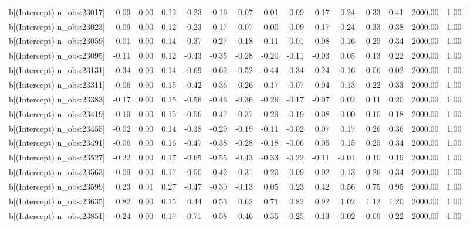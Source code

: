 \begin{table}[ht]
\begin{tabular}{rrrrrrrrrrrrrrr}
  b[(Intercept) n\_obs:23017] & 0.09 & 0.00 & 0.12 & -0.23 & -0.16 & -0.07 & 0.01 & 0.09 & 0.17 & 0.24 & 0.33 & 0.41 & 2000.00 & 1.00 \\ 
  b[(Intercept) n\_obs:23023] & 0.09 & 0.00 & 0.12 & -0.23 & -0.17 & -0.07 & 0.00 & 0.09 & 0.17 & 0.24 & 0.33 & 0.38 & 2000.00 & 1.00 \\ 
  b[(Intercept) n\_obs:23059] & -0.01 & 0.00 & 0.14 & -0.37 & -0.27 & -0.18 & -0.11 & -0.01 & 0.08 & 0.16 & 0.25 & 0.34 & 2000.00 & 1.00 \\ 
  b[(Intercept) n\_obs:23095] & -0.11 & 0.00 & 0.12 & -0.43 & -0.35 & -0.28 & -0.20 & -0.11 & -0.03 & 0.05 & 0.13 & 0.22 & 2000.00 & 1.00 \\ 
  b[(Intercept) n\_obs:23131] & -0.34 & 0.00 & 0.14 & -0.69 & -0.62 & -0.52 & -0.44 & -0.34 & -0.24 & -0.16 & -0.06 & 0.02 & 2000.00 & 1.00 \\ 
  b[(Intercept) n\_obs:23311] & -0.06 & 0.00 & 0.15 & -0.42 & -0.36 & -0.26 & -0.17 & -0.07 & 0.04 & 0.13 & 0.22 & 0.33 & 2000.00 & 1.00 \\ 
  b[(Intercept) n\_obs:23383] & -0.17 & 0.00 & 0.15 & -0.56 & -0.46 & -0.36 & -0.26 & -0.17 & -0.07 & 0.02 & 0.11 & 0.20 & 2000.00 & 1.00 \\ 
  b[(Intercept) n\_obs:23419] & -0.19 & 0.00 & 0.15 & -0.56 & -0.47 & -0.37 & -0.29 & -0.19 & -0.08 & -0.00 & 0.10 & 0.18 & 2000.00 & 1.00 \\ 
  b[(Intercept) n\_obs:23455] & -0.02 & 0.00 & 0.14 & -0.38 & -0.29 & -0.19 & -0.11 & -0.02 & 0.07 & 0.17 & 0.26 & 0.36 & 2000.00 & 1.00 \\ 
  b[(Intercept) n\_obs:23491] & -0.06 & 0.00 & 0.16 & -0.47 & -0.38 & -0.28 & -0.18 & -0.06 & 0.05 & 0.15 & 0.25 & 0.34 & 2000.00 & 1.00 \\ 
  b[(Intercept) n\_obs:23527] & -0.22 & 0.00 & 0.17 & -0.65 & -0.55 & -0.43 & -0.33 & -0.22 & -0.11 & -0.01 & 0.10 & 0.19 & 2000.00 & 1.00 \\ 
  b[(Intercept) n\_obs:23563] & -0.09 & 0.00 & 0.17 & -0.50 & -0.42 & -0.31 & -0.20 & -0.09 & 0.02 & 0.13 & 0.26 & 0.34 & 2000.00 & 1.00 \\ 
  b[(Intercept) n\_obs:23599] & 0.23 & 0.01 & 0.27 & -0.47 & -0.30 & -0.13 & 0.05 & 0.23 & 0.42 & 0.56 & 0.75 & 0.95 & 2000.00 & 1.00 \\ 
  b[(Intercept) n\_obs:23635] & 0.82 & 0.00 & 0.15 & 0.44 & 0.53 & 0.62 & 0.71 & 0.82 & 0.92 & 1.02 & 1.12 & 1.20 & 2000.00 & 1.00 \\ 
  b[(Intercept) n\_obs:23851] & -0.24 & 0.00 & 0.17 & -0.71 & -0.58 & -0.46 & -0.35 & -0.25 & -0.13 & -0.02 & 0.09 & 0.22 & 2000.00 & 1.00 \\ 

\end{tabular}
\end{table}
